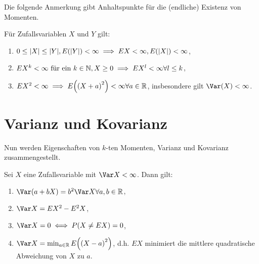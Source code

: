 \documentclass{lecture}
\begin{document}
    Die folgende Anmerkung gibt Anhaltspunkte für die (endliche) Existenz von Momenten.
    
    \begin{remark}
        Für Zufallsvariablen \(X\) und \(Y\) gilt:
        \begin{enumerate}
            \item \(0 \le \absolute*{X} \le \absolute*{Y}, E\parentheses*{\absolute*{Y}} < \infty \implies EX < \infty, E\parentheses*{\absolute*{X}} < \infty\),
            \item \(EX^k < \infty\text{ für ein }k \in \mathbb{N}, X \ge 0 \implies EX^l < \infty \forall l \le k\),
            \item \(EX^2 < \infty \implies E\parentheses*{\parentheses*{X + a}^2} < \infty \forall a \in \R\), insbesondere gilt \(\Var\parentheses*{X} < \infty\).
        \end{enumerate}
    \end{remark}
    
    
    \section*{Varianz und Kovarianz}
    
    Nun werden Eigenschaften von \(k\)-ten Momenten, Varianz und Kovarianz zusammengestellt.
    
    \begin{lemma}
        Sei \(X\) eine Zufallsvariable mit \(\Var X < \infty\).
        Dann gilt:
        \begin{enumerate}
            \item \(\Var\parentheses*{a + bX} = b^2 \Var X \forall a, b \in \R\),
            \item \(\Var X = EX^2 - E^2 X\),
            \item \(\Var X = 0 \iff P\parentheses*{X \ne EX} = 0\),
            \item \(\Var X = \min_{a \in \R}E\parentheses*{\parentheses*{X - a}^2}\), d.h. \(EX\) minimiert die mittlere quadratische Abweichung von \(X\) zu \(a\).
        \end{enumerate}
    \end{lemma}
    
\end{document}
